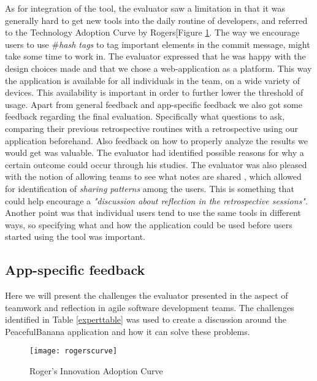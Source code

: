 As for integration of the tool, the evaluator saw a limitation in that it was generally hard to get new tools into the daily routine of developers\citep{rogers2010diffusion}, and referred to the Technology Adoption Curve by Rogers[Figure \ref{rogerscurve}. The way we encourage users to use \#\emph{hash tags} to tag important elements in the commit message, might take some time to work in. The evaluator expressed that he was happy with the design choices made and that we chose a web-application as a platform. This way the application is available for all individuals in the team, on a wide variety of devices. This availability is important in order to further lower the threshold of usage. Apart from general feedback and app-specific feedback we also got some feedback regarding the final evaluation. Specifically what questions to ask, comparing their previous retrospective routines with a retrospective using our application beforehand. Also feedback on how to properly analyze the results we would get was valuable. The evaluator had identified possible reasons for why a certain outcome could occur through his studies. The evaluator was also pleased with the notion of allowing teams to see what notes are shared , which allowed for identification of \emph{sharing patterns} among the users. This is something that could help encourage a \emph{"discussion about reflection in the retrospective sessions"}. Another point was that individual users tend to use the same tools in different ways, so specifying what and how the application could be used before users started using the tool was important.  
\subsection{App-specific feedback}
Here we will present the challenges the evaluator presented in the aspect of teamwork and reflection in agile software development teams. The challenges identified in Table \ref{experttable} was used to create a discussion around the PeacefulBanana application and how it can solve these problems. 
\begin{figure}[H]
    \centering
        \texttt{[image: rogerscurve]}
    \caption{Roger's Innovation Adoption Curve \citep{rogers2010diffusion}}
    \label{rogerscurve}
\end{figure}

\newpage

